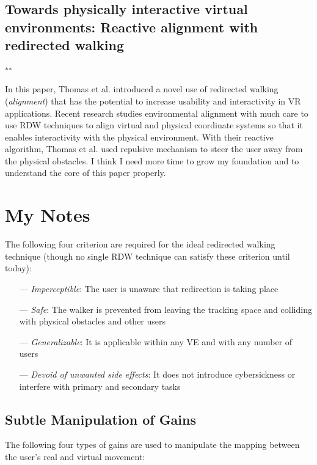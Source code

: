 \documentclass[12pt]{article}
\begin{document}
\subsection{Towards physically interactive virtual environments: Reactive alignment with redirected walking}
\textbf{\cite{thomas2020towards}}\textsuperscript{**}

In this paper, Thomas et al. introduced a novel use of redirected walking (\emph{alignment}) that has the potential to increase usability and interactivity in VR applications. Recent research studies environmental alignment with much care to use RDW techniques to align virtual and physical coordinate systems so that it enables interactivity with the physical environment. With their reactive algorithm, Thomas et al. used repulsive mechanism to steer the user away from the physical obstacles. I think I need more time to grow my foundation and to understand the core of this paper properly.

\section{My Notes}

The following four criterion are required for the ideal redirected walking technique (though no single RDW technique can satisfy these criterion until today):

\begin{itemize}[noitemsep]
    \item[---] \emph{Imperceptible}: The user is unaware that redirection is taking place
    \item[---] \emph{Safe}: The walker is prevented from leaving the tracking space and colliding with physical obstacles and other users
    \item[---] \emph{Generalizable}: It is applicable within any VE and with any number of users
    \item[---] \emph{Devoid of unwanted side effects}: It does not introduce cybersickness or interfere with primary and secondary tasks
\end{itemize}

\subsection{Subtle Manipulation of Gains}

The following four types of gains are used to manipulate the mapping between the user's real and virtual movement:
\end{document}

